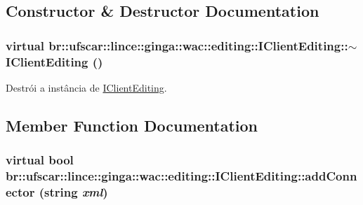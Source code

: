 \subsection{Constructor \& Destructor Documentation}
\hypertarget{classbr_1_1ufscar_1_1lince_1_1ginga_1_1wac_1_1editing_1_1IClientEditing_a21e82d63b608e607a5618e6527cdfe23}{
\subsubsection[{$\sim$IClientEditing}]{\setlength{\rightskip}{0pt plus 5cm}virtual br::ufscar::lince::ginga::wac::editing::IClientEditing::$\sim$IClientEditing ()}}
\label{classbr_1_1ufscar_1_1lince_1_1ginga_1_1wac_1_1editing_1_1IClientEditing_a21e82d63b608e607a5618e6527cdfe23}


Destrói a instância de \hyperlink{classbr_1_1ufscar_1_1lince_1_1ginga_1_1wac_1_1editing_1_1IClientEditing}{IClientEditing}. 



\subsection{Member Function Documentation}
\hypertarget{classbr_1_1ufscar_1_1lince_1_1ginga_1_1wac_1_1editing_1_1IClientEditing_a531eb37bc22963dcb2feeed0e07591bd}{
\subsubsection[{addConnector}]{\setlength{\rightskip}{0pt plus 5cm}virtual bool br::ufscar::lince::ginga::wac::editing::IClientEditing::addConnector (string {\em xml})}}
\label{classbr_1_1ufscar_1_1lince_1_1ginga_1_1wac_1_1editing_1_1IClientEditing_a531eb37bc22963dcb2feeed0e07591bd}


